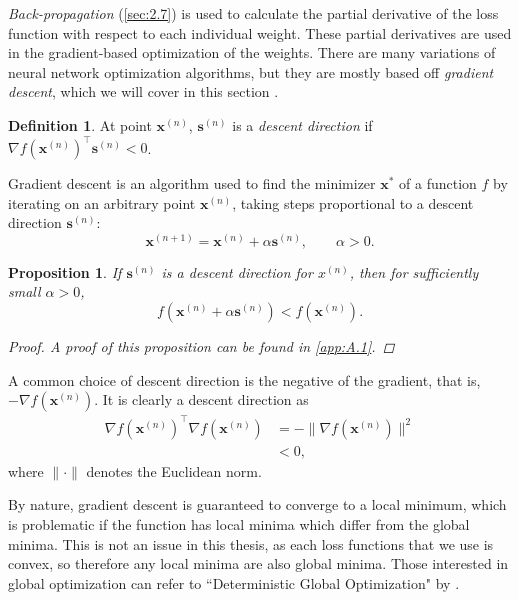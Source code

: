 \documentclass[honours,12pt, twoside]{unswthesis}
\newtheorem{proposition}[theorem]{Proposition}
\numberwithin{equation}{section}
\theoremstyle{definition}
\newtheorem{definition}[theorem]{Definition}
\begin{document}
\textit{Back-propagation} (\autoref{sec:2.7}) is used to calculate the partial derivative of the loss function with respect to each individual weight. These partial derivatives are used in the gradient-based optimization of the weights. There are many variations of neural network optimization algorithms, but they are mostly based off \textit{gradient descent}, which we will cover in this section \citep{optimneural}.
\begin{definition}
At point $\bm{x}^{(n)}$, $\bm{s}^{(n)}$ is a \textit{descent direction} if $\nabla f\left(\bm{x}^{(n)}\right)^\top \bm{s}^{(n)}<0$.
\end{definition}
Gradient descent \citep{optim} is an algorithm used to find the minimizer $\bm{x}^*$ of a function $f$ by iterating on an arbitrary point $\bm{x}^{(n)}$, taking steps proportional to a descent direction $\bm{s}^{(n)}$:
\[\bm{x}^{(n+1)}=\bm{x}^{(n)}+\alpha \bm{s}^{(n)},\qquad \alpha>0.\]
\begin{proposition} \citep{beck} If $\bm{s}^{(n)}$ is a descent direction for $x^{(n)}$, then for sufficiently small $\alpha>0$,
\[f\left(\bm{x}^{(n)}+\alpha \bm{s}^{(n)}\right)<f\left(\bm{x}^{(n)}\right).\]
\begin{proof}
A proof of this proposition can be found in \autoref{app:A.1}.
\end{proof}
\end{proposition}
A common choice of descent direction is the negative of the gradient, that is, $-\nabla f\left(\bm{x}^{(n)}\right)$. It is clearly a descent direction as 
\begin{align*}
\nabla f(\bm{x}^{(n)})^\top\nabla f\left(\bm{x}^{(n)}\right)&=-\|\nabla f\left(\bm{x}^{(n)}\right)\|^2\\
&<0,
\end{align*} where $\|\cdot\|$ denotes the Euclidean norm.

By nature, gradient descent is guaranteed to converge to a local minimum, which is problematic if the function has local minima which differ from the global minima. This is not an issue in this thesis, as each loss functions that we use is convex, so therefore any local minima are also global minima. Those interested in global optimization can refer to ``Deterministic Global Optimization" by \citet{floudas}.
\end{document}
